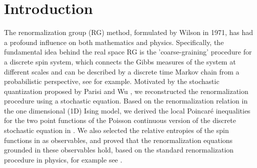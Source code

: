 \documentclass[11pt]{article}
\numberwithin{equation}{section}%
\numberwithin{figure}{section}%
\theoremstyle{remark}
\begin{document}
	\begin{abstract}
		The renormalization group (RG) method is an important tool for studying critical phenomena. In this paper, we employ stochastic analysis techniques to investigate the stochastic partial differential equation (SPDE) derived by regularizing and continuousizing the discrete stochastic equation, which is a variant of stochastic quantization equation of the one dimensional (1D) Ising model. Firstly, we give the regularity estimates for the solution to SPDE. Secondly, we prove the Clark-Ocone-Haussmann formula and derive the log-Sobolev inequality up to the terminal time $T$, as well as obtain a priori form of the renormalization relation. Finally, we verify the correctness of the renormalization procedure based on the partition function, and prove that the two point correlation functions of SPDE on lattices converge to the two point correlation functions of the 1D Ising model at the stable fixed point of the RG transformation as $T\rightarrow +\infty$.\\
		
		~Log-Sobolev inequality; Clark-Ocone-Haussmann formula; Stochastic quantization; Renormalization; Correlation function.
	\end{abstract}
	
	\section{Introduction}\label{sec:1}
	The renormalization group (RG) method, formulated by Wilson in 1971, has had a profound influence on both mathematics and physics. Specifically, the fundamental idea behind the real space RG is the 'coarse-graining' procedure for a discrete spin system, which  connects the Gibbs measures of the system at different scales and can be described by a discrete time Markov chain from a probabilistic perspective, see \cite{Morandi2001document} for example. Motivated by the stochastic quantization proposed by Parisi and Wu \cite{PARISI1981document}, we reconstructed the renormalization  procedure using a stochastic equation. Based on the renormalization relation in the one dimensional (1D) Ising model, we derived the local Poincaré inequalities for the two point functions of the Poisson continuous version of the discrete stochastic equation in \cite{Cui2022document}. We also selected the relative entropies of the spin functions in \cite{Cui2024document} as observables, and proved that the renormalization equations grounded in these observables hold, based on the standard renormalization procedure in physics, for example see \cite{Zinn2007document}.
	
\end{document}
